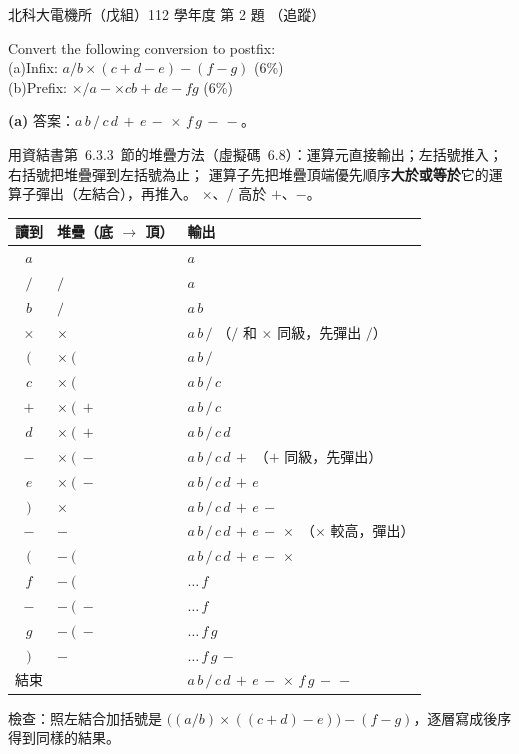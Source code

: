 \begin{pastexam}[label={px:ntut-112-ee-ds-02}]{北科大電機所（戊組）112 學年度 第 2 題}
（追蹤）

Convert the following conversion to postfix:\\
(a)Infix: $a/b\times(c+d-e)-(f-g)$ (6\%)\\
(b)Prefix: $\times/a-\times cb+de-fg$ (6\%)
\end{pastexam}

\begin{pastsoln}
\textbf{(a)} 答案：$a\,b\,/\,c\,d\,+\,e\,-\,\times\,f\,g\,-\,-$。

用資結書第~6.3.3~節的堆疊方法（虛擬碼~6.8）：運算元直接輸出；左括號推入；右括號把堆疊彈到左括號為止；
運算子先把堆疊頂端優先順序\textbf{大於或等於}它的運算子彈出（左結合），再推入。 $\times$、$/$ 高於
$+$、$-$。

\begin{center}
\small
\begin{tabular}{cll}
\toprule
讀到 & 堆疊（底 $\to$ 頂） & 輸出 \\
\midrule
$a$ & & $a$ \\
$/$ & $/$ & $a$ \\
$b$ & $/$ & $a\,b$ \\
$\times$ & $\times$ & $a\,b\,/$ \quad（$/$ 和 $\times$ 同級，先彈出 $/$） \\
$($ & $\times\ ($ & $a\,b\,/$ \\
$c$ & $\times\ ($ & $a\,b\,/\,c$ \\
$+$ & $\times\ (\ +$ & $a\,b\,/\,c$ \\
$d$ & $\times\ (\ +$ & $a\,b\,/\,c\,d$ \\
$-$ & $\times\ (\ -$ & $a\,b\,/\,c\,d\,+$ \quad（$+$ 同級，先彈出） \\
$e$ & $\times\ (\ -$ & $a\,b\,/\,c\,d\,+\,e$ \\
$)$ & $\times$ & $a\,b\,/\,c\,d\,+\,e\,-$ \\
$-$ & $-$ & $a\,b\,/\,c\,d\,+\,e\,-\,\times$ \quad（$\times$ 較高，彈出） \\
$($ & $-\ ($ & $a\,b\,/\,c\,d\,+\,e\,-\,\times$ \\
$f$ & $-\ ($ & $\ldots\,f$ \\
$-$ & $-\ (\ -$ & $\ldots\,f$ \\
$g$ & $-\ (\ -$ & $\ldots\,f\,g$ \\
$)$ & $-$ & $\ldots\,f\,g\,-$ \\
結束 & & $a\,b\,/\,c\,d\,+\,e\,-\,\times\,f\,g\,-\,-$ \\
\bottomrule
\end{tabular}
\end{center}
檢查：照左結合加括號是 $\bigl((a/b) \times ((c+d)-e)\bigr) - (f-g)$，逐層寫成後序得到同樣的結果。


\end{pastsoln}
